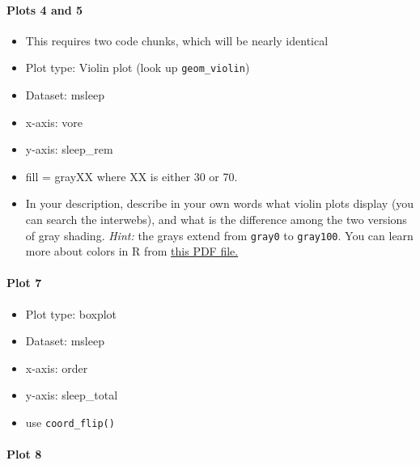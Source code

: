 \documentclass[]{article}
\providecommand{\tightlist}{%
  \setlength{\itemsep}{0pt}\setlength{\parskip}{0pt}}
\let\oldparagraph\paragraph
\renewcommand{\paragraph}[1]{\oldparagraph{#1}\mbox{}}
\begin{document}
\hypertarget{plots-4-and-5}{%
\paragraph{Plots 4 and 5}\label{plots-4-and-5}}

\begin{itemize}
\item
  This requires two code chunks, which will be nearly identical
\item
  Plot type: Violin plot (look up \texttt{geom\_violin})
\item
  Dataset: msleep
\item
  x-axis: vore
\item
  y-axis: sleep\_rem
\item
  fill = grayXX where XX is either 30 or 70.
\item
  In your description, describe in your own words what violin plots
  display (you can search the interwebs), and what is the difference
  among the two versions of gray shading. \emph{Hint:} the grays extend
  from \texttt{gray0} to \texttt{gray100}. You can learn more about
  colors in R from
  \href{https://www.nceas.ucsb.edu/~frazier/RSpatialGuides/colorPaletteCheatsheet.pdf}{this
  PDF file.}
\end{itemize}

\hypertarget{plot-7}{%
\paragraph{Plot 7}\label{plot-7}}

\begin{itemize}
\tightlist
\item
  Plot type: boxplot
\item
  Dataset: msleep
\item
  x-axis: order
\item
  y-axis: sleep\_total
\item
  use \texttt{coord\_flip()}
\end{itemize}

\hypertarget{plot-8}{%
\paragraph{Plot 8}\label{plot-8}}
\end{document}
